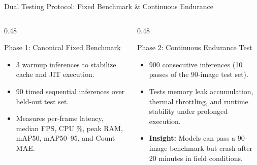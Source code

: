 \documentclass[aspectratio=169,10pt]{beamer}
\begin{document}
\begin{frame}{Dual Testing Protocol: Fixed Benchmark \& Continuous Endurance}
\begin{columns}[T]
  \begin{column}{0.48\textwidth}
    \begin{block}{\small Phase 1: Canonical Fixed Benchmark}
      \small
      \begin{itemize}
        \item 3 warmup inferences to stabilize cache and JIT execution.
        \item 90 timed sequential inferences over held-out test set.
        \item Measures per-frame latency, median FPS, CPU \%, peak RAM, mAP50, mAP50--95, and Count MAE.
      \end{itemize}
    \end{block}
  \end{column}
  \begin{column}{0.48\textwidth}
    \begin{block}{\small Phase 2: Continuous Endurance Test}
      \small
      \begin{itemize}
        \item 900 consecutive inferences (10 passes of the 90-image test set).
        \item Tests memory leak accumulation, thermal throttling, and runtime stability under prolonged execution.
        \item \textbf{Insight:} Models can pass a 90-image benchmark but crash after 20 minutes in field conditions.
      \end{itemize}
    \end{block}
  \end{column}
\end{columns}
\end{frame}

\end{document}
